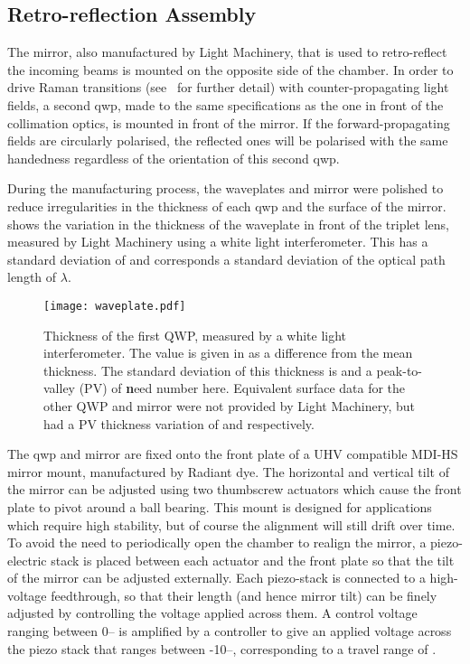 \subsection{Retro-reflection Assembly}\label{subsec:setup_ramanmirror}
The mirror, also manufactured by Light Machinery, that is used to retro-reflect the incoming beams is mounted on the opposite side of the chamber. In order to drive Raman transitions (see~ for further detail) with counter-propagating light fields, a second \ac{qwp}, made to the same specifications as the one in front of the collimation optics, is mounted in front of the mirror. If the forward-propagating fields are circularly polarised, the reflected ones will be polarised with the same handedness regardless of the orientation of this second \ac{qwp}. \par\noindent
During the manufacturing process, the waveplates and mirror were polished to reduce irregularities in the thickness of each \ac{qwp} and the surface of the mirror.  shows the variation in the thickness of the waveplate in front of the triplet lens, measured by Light Machinery using a white light interferometer. This has a standard deviation of  and corresponds a standard deviation of the optical path length of \(\lambda\). 
\begin{figure}
    \centering
    \texttt{[image: waveplate.pdf]}
    \caption{Thickness of the first \ac{QWP}, measured by a white light interferometer. The value is given in \sivalue{}{\nano\metre} as a difference from the mean thickness. The standard deviation of this thickness is  and a peak-to-valley (PV) of {\textbf need number here}. Equivalent surface data for the other \ac{QWP} and mirror were not provided by Light Machinery, but had a PV thickness variation of  and  respectively.}
    \label{fig:waveplate_map}
\end{figure}
\par\noindent
The \ac{qwp} and mirror are fixed onto the front plate of a UHV compatible MDI-HS mirror mount, manufactured by Radiant dye. The horizontal and vertical tilt of the mirror can be adjusted using two thumbscrew actuators which cause the front plate to pivot around a ball bearing. This mount is designed for applications which require high stability, but of course the alignment will still drift over time. To avoid the need to periodically open the chamber to realign the mirror, a piezo-electric stack is placed between each actuator and the front plate so that the tilt of the mirror can be adjusted externally. Each piezo-stack is connected to a high-voltage feedthrough, so that their length (and hence mirror tilt) can be finely adjusted by controlling the voltage applied across them. A control voltage ranging between 0-- is amplified by a controller to give an applied voltage across the piezo stack that ranges between -10--, corresponding to a travel range of . 
